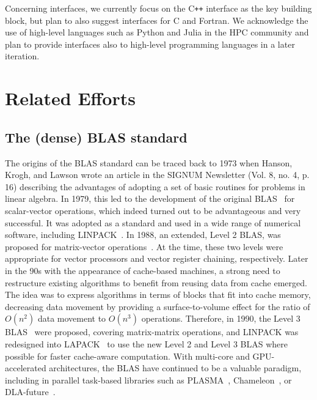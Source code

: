 \documentclass[manuscript,review]{acmart}
\newcommand{\cplusplus}{C\texttt{++}\xspace}
\begin{document}
Concerning interfaces, we currently focus on the \cplusplus interface as the key building block, but plan to also suggest interfaces for C and Fortran.  We acknowledge the use of high-level languages such as Python and Julia in the HPC community and plan to provide interfaces also to high-level programming languages in a later iteration.

\section{Related Efforts}

\subsection{The (dense) BLAS standard}
The origins of the BLAS standard can be
traced back to 1973 when Hanson, Krogh, and Lawson wrote an article in the
SIGNUM Newsletter (Vol. 8, no. 4, p. 16) \cite{HansonKroghLawson1973SINUM_newsletter} describing the advantages of adopting
a set of basic routines for problems in linear algebra. In 1979, this led to the
development of the original BLAS~\cite{Lawson1979l1blas} for scalar-vector operations, which indeed turned out to be
advantageous and very successful. It was adopted as a standard and used in a
wide range of numerical software, including LINPACK~\cite{Dongara:1979:linpack}. In 1988, an extended, Level 2 BLAS, was proposed for matrix-vector operations~\cite{dongarra1988a,dongarra1988b}.
At the time, these two levels were appropriate for vector processors and
vector register chaining, respectively.
Later in the 90s with the appearance of cache-based machines, a strong need to restructure existing algorithms to benefit from reusing data from cache emerged.
The idea was to express algorithms in terms of blocks that fit into cache memory,
decreasing data movement by providing a surface-to-volume effect for
the ratio of $O(n^2)$ data movement to $O(n^3)$ operations.
Therefore, in 1990, the Level 3 BLAS~\cite{dongarra1990a,dongarra1990b} were proposed,
covering matrix-matrix operations, and LINPACK was redesigned
into LAPACK~\cite{anderson1999} to use the new Level 2 and Level 3 BLAS where possible for faster cache-aware computation.
With multi-core and GPU-accelerated architectures, the BLAS have continued to
be a valuable paradigm, including in parallel task-based libraries such
as PLASMA~\cite{agullo2009numerical}, Chameleon~\cite{chameleon}, or DLA-future~\cite{10.1007/978-3-031-61763-8_13}.
\end{document}
